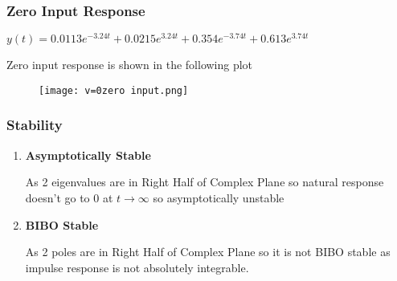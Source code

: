 \documentclass[notitlepage]{article}
\begin{document}
\pagebreak
\subsubsection{Zero Input Response}

\vspace{1mm}

$y(t)=0.0113e^{-3.24t} + 0.0215e^{3.24t} + 0.354e^{-3.74t} + 0.613e^{3.74t}$

\vspace{2mm}

Zero input response is shown in the following plot
\begin{figure}[!h]
    \centering
    \texttt{[image: v=0zero input.png]}
    \label{fig:my_label}
\end{figure}

\newpage
\subsubsection{Stability}
\begin{enumerate}
\item \textbf{Asymptotically Stable}

As 2  eigenvalues are in Right Half of Complex Plane so natural response doesn't go to 0 at $t\rightarrow{\infty}$ so  asymptotically unstable

\item \textbf{BIBO Stable}

\vspace{1mm}
As 2 poles are in Right Half of Complex Plane so it is not BIBO stable as impulse response  is not absolutely integrable.
\end{enumerate}


\vspace{2mm}

\end{document}
